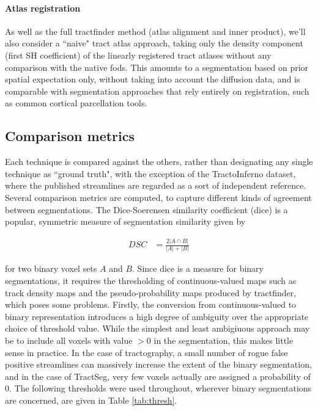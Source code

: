 \paragraph*{Atlas registration}

As well as the full tractfinder method (atlas alignment and inner product), we'll also consider a ``naive" tract atlas approach, taking only the density component (first SH coefficient) of the linearly registered tract atlases without any comparison with the native \glspl{fod}.
This amounts to a segmentation based on prior spatial expectation only, without taking into account the diffusion data, and is comparable with segmentation approaches that rely entirely on registration, such as common cortical parcellation tools.

\subsection{Comparison metrics}

Each technique is compared against the others, rather than designating any single technique as ``ground truth", with the exception of the TractoInferno dataset, where the published streamlines are regarded as a sort of independent reference.
Several comparison metrics are computed, to capture different kinds of agreement between segmentations.
The Dice-Soerensen similarity coefficient (\gls{dice}) \autocite{Dice1945} is a popular, symmetric measure of segmentation similarity given by

\begin{align}
  DSC &= \frac{2 |A \cap B|}{|A| + |B|}
\end{align}

for two binary voxel sets $A$ and $B$.
Since \gls{dice} is a measure for binary segmentations, it requires the thresholding of continuous-valued maps such as track density maps and the pseudo-probability maps produced by tractfinder, which poses some problems.
Firstly, the conversion from continuous-valued to binary representation introduces a high degree of ambiguity over the appropriate choice of threshold value.
While the simplest and least ambigiuous approach may be to include all voxels with value $>0$ in the segmentation, this makes little sense in practice.
In the case of tractography, a small number of rogue false positive streamlines can massively increase the extent of the binary segmentation, and in the case of TractSeg, very few voxels actually are assigned a probability of 0.
The following thresholds were used throughout, wherever binary segmentations are concerned, are given in Table \ref{tab:thresh}.

